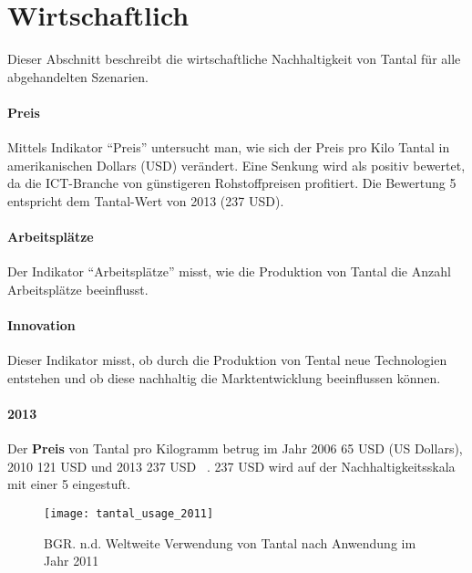 
\section{Wirtschaftlich}\label{sec:conflict}

Dieser Abschnitt beschreibt die wirtschaftliche Nachhaltigkeit von Tantal für alle abgehandelten Szenarien.
\paragraph{Preis}
Mittels Indikator ``Preis'' untersucht man, wie sich der Preis pro Kilo Tantal
in amerikanischen Dollars (USD) verändert. Eine Senkung wird als positiv bewertet, da die ICT-Branche von günstigeren Rohstoffpreisen profitiert. Die Bewertung 5 entspricht dem Tantal-Wert von 2013 (237 USD).

\paragraph{Arbeitsplätze}
Der Indikator ``Arbeitsplätze'' misst, wie die Produktion von Tantal die Anzahl
Arbeitsplätze beeinflusst.

\paragraph{Innovation}
Dieser Indikator misst, ob durch die Produktion von Tental neue Technologien
entstehen und ob diese nachhaltig die Marktentwicklung beeinflussen können.

\paragraph{2013}
Der \textbf{Preis} von Tantal pro Kilogramm betrug im Jahr 2006 65 USD (US Dollars), 2010 121 USD und 2013 237 USD ~\cite{tantal_price2}. 237 USD wird auf der Nachhaltigkeitsskala mit einer 5 eingestuft. 
\\
\begin{figure}[htp]
\centering
\texttt{[image: tantal\_usage\_2011]}
\caption{BGR. n.d. Weltweite Verwendung von Tantal nach Anwendung im Jahr 2011 ~\cite{tantal_usage}}
\label{}
\end{figure}

